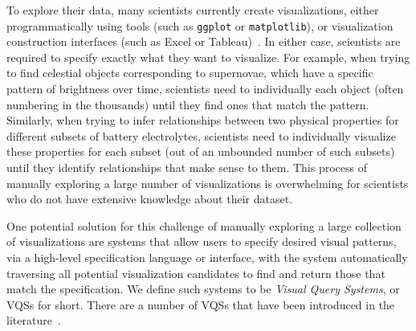 To explore their data, many scientists currently
create visualizations, either programmatically using 
tools (such as {\tt ggplot} or {\tt matplotlib}),
or visualization construction interfaces (such as 
Excel or Tableau)~\cite{Momcheva2015,Prabhu2011,Duck2016}. 
In either case, scientists are required to specify exactly what
they want to visualize.  For example, when trying to find celestial objects
corresponding to supernovae, which have a specific pattern
of brightness over time, scientists
need to individually  
each object (often numbering in the thousands) until they find ones that match the pattern. Similarly, when trying to infer relationships between two physical
properties for different subsets of battery electrolytes,
scientists need to individually visualize these properties
for each subset (out of an unbounded number of such subsets)
until they identify relationships that make sense to them. This process of manually exploring a large number of visualizations 
is  overwhelming for scientists who do not have extensive knowledge about their
dataset. 
\par One potential solution for this challenge of manually exploring a large collection of visualizations
are systems that allow users to specify 
desired visual patterns, via a high-level specification language
or interface, with the system automatically
traversing all potential visualization candidates to find
and return those that match the specification. 
We define such systems to be {\em Visual Query Systems}, or VQSs for short.
There are a number of VQSs that have been introduced in the literature~\cite{mohebbi2011google,Hochheiser2004,wattenberg2001sketching,Siddiqui2017VLDB,ryall2005querylines,holz2009relaxed}. 
\par {}
